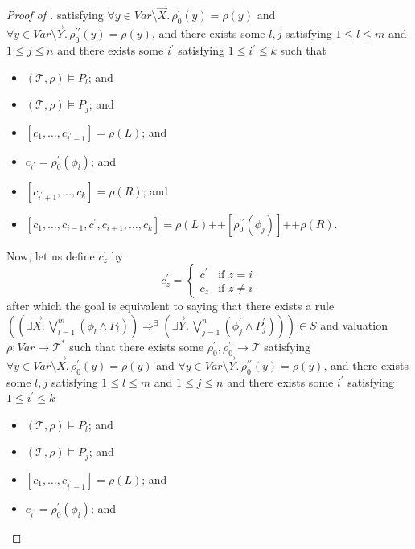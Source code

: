 \documentclass{article}
\begin{document}
\begin{proof}[Proof of ]
satisfying $\forall y \in \mathit{Var} \setminus \vec{X}.\, \rho_0^\prime(y) = \rho(y)$
and $\forall y \in \mathit{Var} \setminus \vec{Y}.\, \rho_0^{\prime\prime}(y) = \rho(y)$,
and there exists some $l,j$ satisfying $1 \leq l \leq m$ and $1 \leq j \leq n$
and there exists some $i^\prime$ satisfying $1 \leq i^\prime \leq k$
such that
\begin{itemize}
    \item $(\mathcal{T}, \rho) \vDash P_l$; and
    \item $(\mathcal{T}, \rho) \vDash P_j$; and
    \item $[c_1,\ldots, c_{i^\prime-1}] = \rho(L)$; and
    \item $c_{i^\prime} = \rho_0^\prime(\phi_l)$; and
    \item $[c_{i^\prime+1},\ldots,c_k] = \rho(R)$; and
    \item $[c_1, \ldots, c_{i-1}, c^\prime, c_{i+1}, \ldots, c_k] = \rho(L)
    \texttt{++} [\rho_0^{\prime\prime}(\phi_j)] 
    \texttt{++} \rho(R)$.
\end{itemize}
Now, let us define $c^\prime_{z}$ by
\begin{equation*}
c^\prime_{z} =
    \begin{cases}
        c^\prime & \text{if } z = i \\
        c_z & \text{if } z \not = i
    \end{cases}
\end{equation*}
after which the goal is equivalent to saying that
there exists a rule $((\exists \vec{X}.\, \bigvee_{l=1}^{m} (\phi_l \land P_l)) \Rightarrow^\exists (\exists \vec{Y}.\, \bigvee_{j=1}^{n} (\phi^\prime_j \land P^\prime_j))) \in S$
and valuation $\rho : \mathit{Var} \to \mathcal{T}^*$ such that
there exists some $\rho_0^\prime,\rho_0^{\prime\prime} \to \mathcal{T}$
satisfying $\forall y \in \mathit{Var} \setminus \vec{X}.\, \rho_0^\prime(y) = \rho(y)$
and $\forall y \in \mathit{Var} \setminus \vec{Y}.\, \rho_0^{\prime\prime}(y) = \rho(y)$,
and there exists some $l,j$ satisfying $1 \leq l \leq m$ and $1 \leq j \leq n$
and there exists some $i^\prime$ satisfying $1 \leq i^\prime \leq k$
\begin{itemize}
    \item $(\mathcal{T}, \rho) \vDash P_l$; and
    \item $(\mathcal{T}, \rho) \vDash P_j$; and
    \item $[c_1,\ldots, c_{i^\prime-1}] = \rho(L)$; and
    \item $c_{i^\prime} = \rho_0^\prime(\phi_l)$; and

\end{itemize}
\end{proof}
\end{document}
